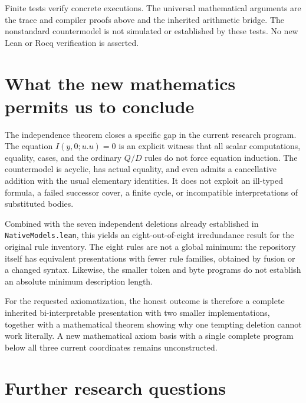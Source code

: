 \documentclass[11pt,letterpaper]{article}
\theoremstyle{definition}
\newcommand{\file}[1]{{\small\nolinkurl{#1}}}
\begin{document}
Finite tests verify concrete executions. The universal mathematical
arguments are the trace and compiler proofs above and the inherited
arithmetic bridge. The nonstandard countermodel is not simulated or
established by these tests. No new Lean or Rocq verification is asserted.

\section{What the new mathematics permits us to conclude}
\label{sec:conclusions}

The independence theorem closes a specific gap in the current research
program. The equation $I(y,0;u.u)=0$ is an explicit witness that all scalar
computations, equality, cases, and the ordinary $Q/D$ rules do not force
equation induction. The countermodel is acyclic, has actual equality, and
even admits a cancellative addition with the usual elementary identities.
It does not exploit an ill-typed formula, a failed successor cover, a
finite cycle, or incompatible interpretations of substituted bodies.

Combined with the seven independent deletions already established in
\file{NativeModels.lean}, this yields an eight-out-of-eight irredundance
result for the original rule inventory. The eight rules are not a global
minimum: the repository itself has equivalent presentations with fewer
rule families, obtained by fusion or a changed syntax. Likewise,
the smaller token and byte programs do not establish an absolute minimum
description length.

For the requested axiomatization, the honest outcome is therefore a
complete inherited bi-interpretable presentation with two smaller
implementations, together with a mathematical theorem showing why one
tempting deletion cannot work literally. A new mathematical axiom basis
with a single complete program below all three current coordinates
remains unconstructed.

\section{Further research questions}
\end{document}
